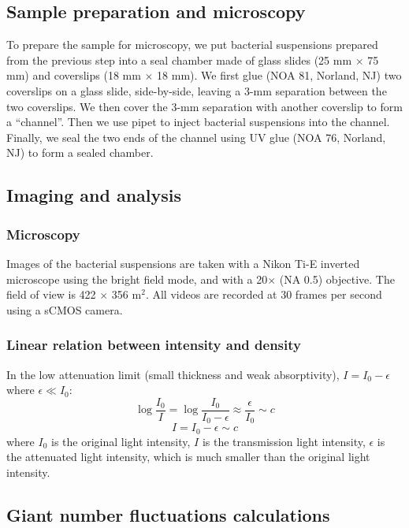 \documentclass[preprint,aps,prl,amsmath,amssymb,longbibliography]{revtex4-2}
\begin{document}
\subsection{Sample preparation and microscopy}

To prepare the sample for microscopy, we put bacterial suspensions prepared from the previous step into a seal chamber made of glass slides (25 mm $\times$ 75 mm) and coverslips (18 mm $\times$ 18 mm). We first glue (NOA 81, Norland, NJ) two coverslips on a glass slide, side-by-side, leaving a 3-mm separation between the two coverslips. We then cover the 3-mm separation with another coverslip to form a ``channel''. Then we use pipet to inject bacterial suspensions into the channel. Finally, we seal the two ends of the channel using UV glue (NOA 76, Norland, NJ) to form a sealed chamber.

\subsection{Imaging and analysis}
\subsubsection{Microscopy}
Images of the bacterial suspensions are taken with a Nikon Ti-E inverted microscope using the bright field mode, and with a 20$\times$ (NA 0.5) objective. The field of view is 422 $\times$ 356 \textmu m$^2$. All videos are recorded at 30 frames per second using a sCMOS camera.
\subsubsection{Linear relation between intensity and density}
In the low attenuation limit (small thickness and weak absorptivity), $I=I_0-\epsilon$ where $\epsilon\ll I_0$:
\begin{equation}
  \log \frac{I_0}{I} = \log \frac{I_0}{I_0 - \epsilon} \approx \frac{\epsilon}{I_0} \sim c
\end{equation}
\begin{equation}
I = I_0 - \epsilon \sim c
\end{equation}
where $I_0$ is the original light intensity, $I$ is the transmission light intensity, $\epsilon$ is the attenuated light intensity, which is much smaller than the original light intensity.

\subsection{Giant number fluctuations calculations}
\end{document}
